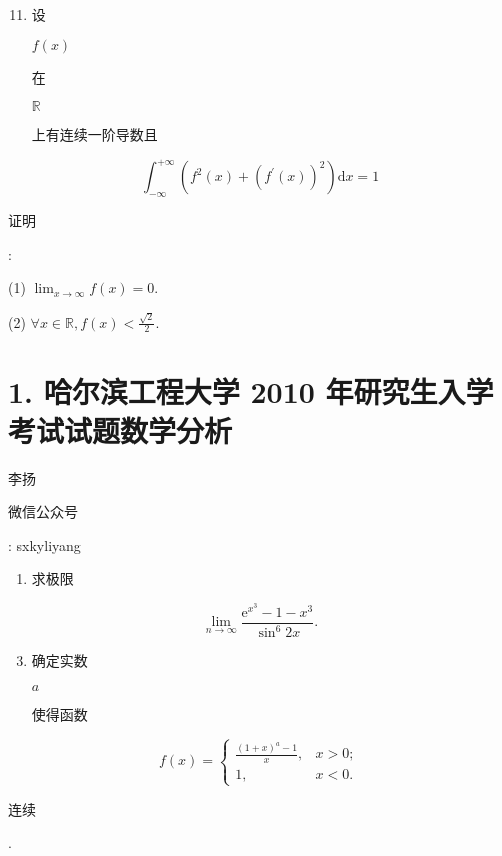 \documentclass[10pt]{article}
\begin{document}
\begin{enumerate}
  \setcounter{enumi}{10}
  \item \begin{CJK}{UTF8}{mj}设\end{CJK} $f(x)$ \begin{CJK}{UTF8}{mj}在\end{CJK} $\mathbb{R}$ \begin{CJK}{UTF8}{mj}上有连续一阶导数且\end{CJK}
\end{enumerate}
$$
\int_{-\infty}^{+\infty}\left(f^{2}(x)+\left(f^{\prime}(x)\right)^{2}\right) \mathrm{d} x=1
$$
\begin{CJK}{UTF8}{mj}证明\end{CJK}:

(1) $\lim _{x \rightarrow \infty} f(x)=0$.

(2) $\forall x \in \mathbb{R}, f(x)<\frac{\sqrt{2}}{2}$.

\section{1. 哈尔滨工程大学 2010 年研究生入学考试试题数学分析}
\begin{CJK}{UTF8}{mj}李扬\end{CJK}

\begin{CJK}{UTF8}{mj}微信公众号\end{CJK}: sxkyliyang

\begin{enumerate}
  \item \begin{CJK}{UTF8}{mj}求极限\end{CJK}
\end{enumerate}
$$
\lim _{n \rightarrow \infty} \frac{\mathrm{e}^{x^{3}}-1-x^{3}}{\sin ^{6} 2 x} .
$$

\begin{enumerate}
  \setcounter{enumi}{2}
  \item \begin{CJK}{UTF8}{mj}确定实数\end{CJK} $a$ \begin{CJK}{UTF8}{mj}使得函数\end{CJK}
\end{enumerate}
$$
f(x)= \begin{cases}\frac{(1+x)^{a}-1}{x}, & x>0 ; \\ 1, & x<0 .\end{cases}
$$
\begin{CJK}{UTF8}{mj}连续\end{CJK}.
\end{document}
